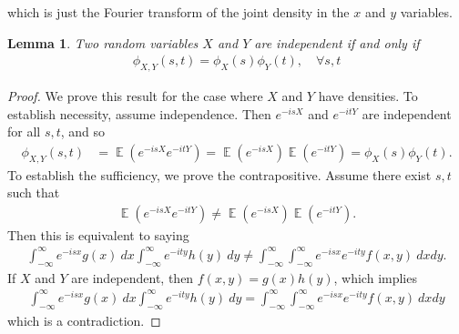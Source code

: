 \documentclass[12pt]{amsbook}
\DeclareMathOperator{\ex}{\mathbb{E}}
\theoremstyle{plain}
\newtheorem{lemma}[theorem]{Lemma}
\theoremstyle{definition}
\theoremstyle{remark}
\numberwithin{equation}{section}  %
\numberwithin{equation}{section}  %
\begin{document}
	which is just the Fourier transform of the joint density in the $x$ and $y$
	variables.
	\begin{lemma}\label{lem:char-ind}
		Two random variables $X$ and $Y$ are independent if and only if
		\begin{equation*}
			\begin{split}
				\phi_{X, Y}(s, t)= \phi_{X}(s) \phi_{Y}(t), \quad \forall s, t
			\end{split}
		\end{equation*}
	\end{lemma}
	\begin{proof}
		We prove this result for the case where $X$ and $Y$ have densities.
		To establish necessity, assume independence. Then
		$e^{-isX}$ and $e^{-itY}$ are independent for all $s, t$, and so
		\begin{equation*}
			\begin{split}
				\phi_{X,Y}(s,t) & = \ex(e^{-isX} e^{-itY}) = \ex(e^{-isX}) \ex(e^{-itY})
				= \phi_{X}(s) \phi_{Y}(t).
			\end{split}
		\end{equation*}
		To establish the sufficiency, we prove the contrapositive. Assume there exist $s, t$ such that
		\begin{equation*}
			\begin{split}
				\ex(e^{-isX} e^{-itY}) \neq \ex(e^{-isX}) \ex(e^{-itY}).
			\end{split}
		\end{equation*}
		Then this is equivalent to saying
		\begin{equation*}
			\begin{split}
				\int_{-\infty}^{\infty} e^{-isx} g(x) \ dx \int_{-\infty}^{\infty}
				e^{-ity} h(y) \ dy
				\neq 
				\int_{-\infty}^{\infty}\int_{-\infty}^{\infty} e^{-isx} e^{-ity} f(x, y) \ dx
				dy.
			\end{split}
		\end{equation*}
		If $X$ and $Y$ are independent, then $f(x, y) = g(x) h(y)$, which implies
		\begin{equation*}
			\begin{split}
				\int_{-\infty}^{\infty} e^{-isx} g(x) \ dx \int_{-\infty}^{\infty}
				e^{-ity} h(y) \ dy
				= 
				\int_{-\infty}^{\infty}\int_{-\infty}^{\infty} e^{-isx} e^{-ity} f(x, y) \ dx dy
			\end{split}
		\end{equation*}
		which is a contradiction.
	\end{proof}
\end{document}

